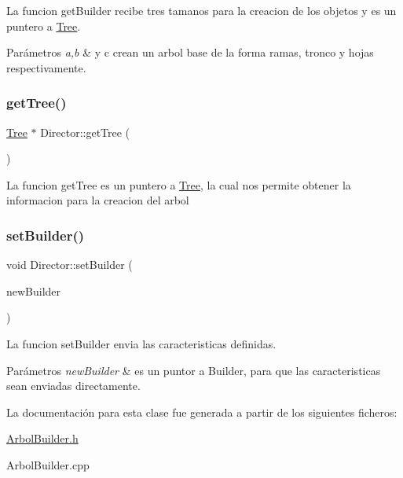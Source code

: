 La funcion get\+Builder recibe tres tamanos para la creacion de los objetos y es un puntero a \hyperlink{classTree}{Tree}. 
\begin{DoxyParams}{Parámetros}
{\em a,b} & y c crean un arbol base de la forma ramas, tronco y hojas respectivamente. \\
\hline
\end{DoxyParams}
\mbox{\label{classDirector_aa05d4a6f7847d53486824d640654a952}} 
\subsubsection{\texorpdfstring{get\+Tree()}{getTree()}}
{\footnotesize\ttfamily \hyperlink{classTree}{Tree} $\ast$ Director\+::get\+Tree (\begin{DoxyParamCaption}{ }\end{DoxyParamCaption})}

La funcion get\+Tree es un puntero a \hyperlink{classTree}{Tree}, la cual nos permite obtener la informacion para la creacion del arbol \mbox{\label{classDirector_a08d3ffc5c9323cc649ba603f4b2d0758}} 
\subsubsection{\texorpdfstring{set\+Builder()}{setBuilder()}}
{\footnotesize\ttfamily void Director\+::set\+Builder (\begin{DoxyParamCaption}\item[{\hyperlink{classTreeBuil}{Tree\+Buil} $\ast$}]{new\+Builder }\end{DoxyParamCaption})}

La funcion set\+Builder envia las caracteristicas definidas. 
\begin{DoxyParams}{Parámetros}
{\em new\+Builder} & es un puntor a Builder, para que las caracteristicas sean enviadas directamente. \\
\hline
\end{DoxyParams}


La documentación para esta clase fue generada a partir de los siguientes ficheros\+:\begin{DoxyCompactItemize}
\item 
\hyperlink{ArbolBuilder_8h}{Arbol\+Builder.\+h}\item 
Arbol\+Builder.\+cpp\end{DoxyCompactItemize}
